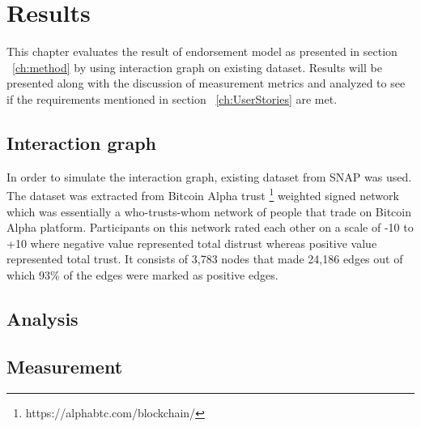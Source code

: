 \chapter{Results} \label{ch:results}
This chapter evaluates the result of endorsement model as presented in section
~\ref{ch:method} by using interaction graph on existing dataset. Results
will be presented along with the discussion of measurement metrics and analyzed
to see if the requirements mentioned in section ~\ref{ch:UserStories} are met.  

\section{Interaction graph}
In order to simulate the interaction graph, existing dataset from SNAP
\cite{snapnets} was used. The dataset was extracted from Bitcoin Alpha trust
\footnote{https://alphabtc.com/blockchain/}
weighted signed network which was essentially a who-trusts-whom network of
people that trade on Bitcoin Alpha platform. Participants on this network rated
each other on a scale of -10 to +10 where negative value represented total
distrust whereas positive value represented total trust. It consists of 3,783
nodes that made 24,186 edges out of which 93\% of the edges were marked as
positive edges\cite{kumar2016edge}. 








\section{Analysis}
\section{Measurement}
